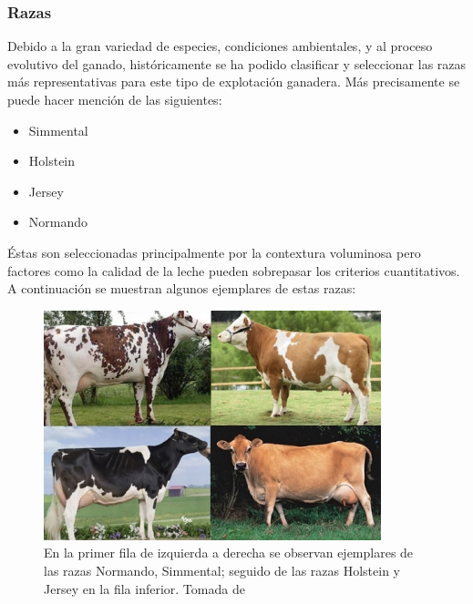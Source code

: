 \subsubsection{Razas}

Debido a la gran variedad de especies, condiciones ambientales, y al proceso evolutivo del ganado, históricamente se ha podido clasificar y seleccionar las razas más representativas para este tipo de explotación ganadera. Más precisamente se puede hacer mención de las siguientes:
\begin{multicols}{2}
    \begin{center}
        \begin{itemize}
        \item Simmental
        \item Holstein
        \item Jersey
        \item Normando
        \end{itemize}
    \end{center}
\end{multicols}

Éstas son seleccionadas principalmente por la contextura voluminosa pero factores como la calidad de la leche pueden sobrepasar los criterios cuantitativos. A continuación se muestran algunos ejemplares de estas razas:

\begin{figure}[H]
 \begin{center}
 \includegraphics[scale=1]{img/razaslecheras.png}
 \caption{En la primer fila de izquierda a derecha se observan ejemplares de las razas Normando, Simmental; seguido de las razas Holstein y Jersey en la fila inferior. Tomada de \cite{contextoganadero} \label{cuadrorazaspng}}
  \end{center}
\end{figure}

